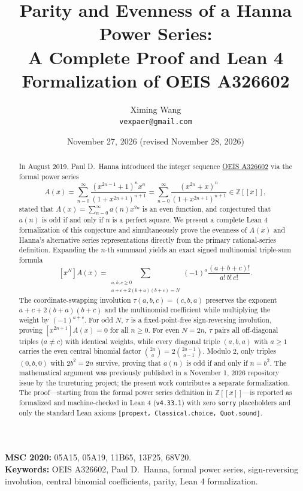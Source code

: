 \documentclass[11pt,a4paper]{article}
\title{\textbf{Parity and Evenness of a Hanna Power Series:\\
A Complete Proof and Lean 4 Formalization of OEIS A326602}}
\author{Ximing Wang\\
\texttt{vexpaer@gmail.com}}
\date{November 27, 2026 (revised November 28, 2026)}
\theoremstyle{definition}
\theoremstyle{remark}
\newcommand{\Z}{\mathbb{Z}}
\newcommand{\coeff}[1]{[x^{#1}]}
\begin{document}
\maketitle

\begin{abstract}
In August 2019, Paul D.~Hanna introduced the integer sequence \href{https://oeis.org/A326602}{OEIS A326602} via the formal power series
\[
A(x) = \sum_{n=0}^{\infty} \frac{(x^{2n-1}+1)^n x^n}{(1+x^{2n+1})^{n+1}}
     = \sum_{n=0}^{\infty} \frac{(x^{2n}+x)^n}{(1+x^{2n+1})^{n+1}} \in \Z[[x]],
\]
stated that $A(x) = \sum_{n=0}^{\infty} a(n) x^{2n}$ is an even function, and conjectured that $a(n)$ is odd if and only if $n$ is a perfect square. We present a complete Lean 4 formalization of this conjecture and simultaneously prove the evenness of $A(x)$ and Hanna's alternative series representations directly from the primary rational-series definition. Expanding the $n$-th summand yields an exact signed multinomial triple-sum formula
\[
\coeff{N} A(x) = \sum_{\substack{a,b,c \ge 0 \\ a + c + 2(b+a)(b+c) = N}} (-1)^a \frac{(a+b+c)!}{a!\,b!\,c!}.
\]
The coordinate-swapping involution $\tau(a,b,c) = (c,b,a)$ preserves the exponent $a + c + 2(b+a)(b+c)$ and the multinomial coefficient while multiplying the weight by $(-1)^{a+c}$. For odd $N$, $\tau$ is a fixed-point-free sign-reversing involution, proving $\coeff{2n+1} A(x) = 0$ for all $n \ge 0$. For even $N = 2n$, $\tau$ pairs all off-diagonal triples ($a \ne c$) with identical weights, while every diagonal triple $(a,b,a)$ with $a \ge 1$ carries the even central binomial factor $\binom{2a}{a} = 2\binom{2a-1}{a-1}$. Modulo $2$, only triples $(0,b,0)$ with $2b^2 = 2n$ survive, proving that $a(n)$ is odd if and only if $n = b^2$. The mathematical argument was previously published in a November 1, 2026 repository issue by the trureturing project; the present work contributes a separate formalization. The proof—starting from the formal power series definition in $\Z[[x]]$—is reported as formalized and machine-checked in Lean 4 (\texttt{v4.33.1}) with zero \texttt{sorry} placeholders and only the standard Lean axioms \texttt{[propext, Classical.choice, Quot.sound]}.
\end{abstract}

\noindent\textbf{MSC 2020:} 05A15, 05A19, 11B65, 13F25, 68V20.\\
\textbf{Keywords:} OEIS A326602, Paul D.~Hanna, formal power series, sign-reversing involution, central binomial coefficients, parity, Lean 4 formalization.
\end{document}
